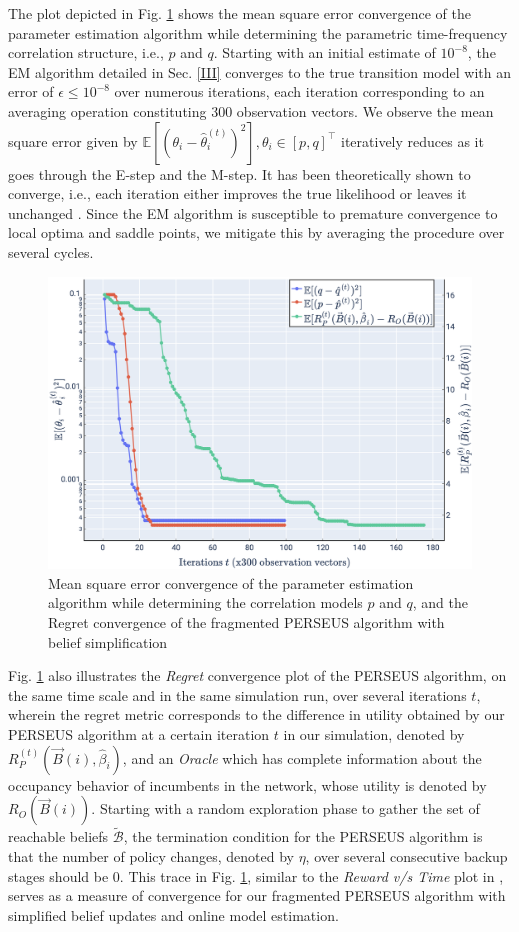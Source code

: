 \documentclass[10pt,twocolumn]{IEEEtran}
\begin{document}
The plot depicted in Fig. \ref{fig:4} shows the mean square error convergence of the parameter estimation algorithm while determining the parametric time-frequency correlation structure, i.e., $p$ and $q$. Starting with an initial estimate of $10^{-8}$, the EM algorithm detailed in Sec. \ref{III} converges to the true transition model with an error of $\epsilon{\leq}10^{-8}$ over numerous iterations, each iteration corresponding to an averaging operation constituting 300 observation vectors. We observe the mean square error given by $\mathbb{E}[(\theta_{i}{-}\hat{\theta}_{i}^{(t)})^{2}],\theta_{i}{\in}[p,q]^{\intercal}$ iteratively reduces as it goes through the E-step and the M-step. It has been theoretically shown to converge, i.e., each iteration either improves the true likelihood or leaves it unchanged \cite{Neal1998}. Since the EM algorithm is susceptible to premature convergence to local optima and saddle points, we mitigate this by averaging the procedure over several cycles.
\begin{figure}
    \centering
    \includegraphics[width=0.80\linewidth]{PerseusRegretConvergence_MeanSquareErrorConvergence.png}
    \caption{Mean square error convergence of the parameter estimation algorithm while determining the correlation models $p$ and $q$, and the Regret convergence of the fragmented PERSEUS algorithm with belief simplification}
    \vspace{-5mm}
    \label{fig:4}
\end{figure}

Fig. \ref{fig:4} also illustrates the \emph{Regret} convergence plot of the PERSEUS algorithm, on the same time scale and in the same simulation run, over several iterations $t$, wherein the regret metric corresponds to the difference in utility obtained by our PERSEUS algorithm at a certain iteration $t$ in our simulation, denoted by $R_{P}^{(t)}(\vec{B}(i), \hat{\beta}_{i})$, and an \emph{Oracle} which has complete information about the occupancy behavior of incumbents in the network, whose utility is denoted by $R_{O}(\vec{B}(i))$. Starting with a random exploration phase to gather the set of reachable beliefs $\tilde{\mathcal{B}}$, the termination condition for the PERSEUS algorithm is that the number of policy changes, denoted by $\eta$, over several consecutive backup stages should be $0$. This trace in Fig. \ref{fig:4}, similar to the \emph{Reward v/s Time} plot in \cite{DBLP:journals/corr/abs-1109-2145}, serves as a measure of convergence for our fragmented PERSEUS algorithm with simplified belief updates and online model estimation.
\end{document}
